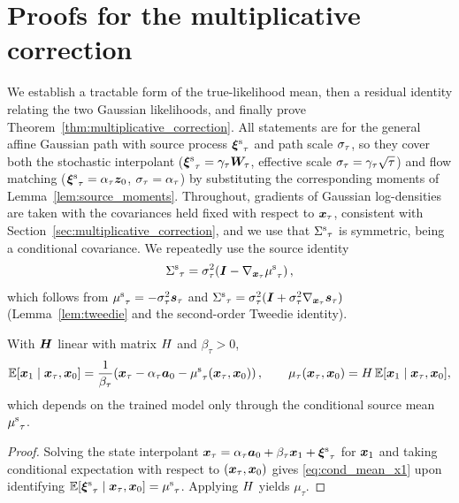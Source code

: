 \section{Proofs for the multiplicative correction}
\label{appendix:proof_multiplicative}

We establish a tractable form of the true-likelihood mean, then a residual identity relating the two Gaussian likelihoods, and finally prove Theorem~\ref{thm:multiplicative_correction}. All statements are for the general affine Gaussian path with source process ${\bm{\xi}^{\mathrm{s}}}_\tau$ and path scale $\sigma_\tau$, so they cover both the stochastic interpolant (${\bm{\xi}^{\mathrm{s}}}_\tau=\gamma_\tau\boldsymbol{W}_\tau$, effective scale $\sigma_\tau=\gamma_\tau\sqrt{\tau}$) and flow matching (${\bm{\xi}^{\mathrm{s}}}_\tau=\alpha_\tau\bm{z}_0$, $\sigma_\tau=\alpha_\tau$) by substituting the corresponding moments of Lemma~\ref{lem:source_moments}. Throughout, gradients of Gaussian log-densities are taken with the covariances held fixed with respect to $\boldsymbol{x}_\tau$, consistent with Section~\ref{sec:multiplicative_correction}, and we use that ${\Sigma^{\mathrm{s}}}_\tau$ is symmetric, being a conditional covariance. We repeatedly use the source identity
\begin{align}\label{eq:source_identity}
    {\Sigma^{\mathrm{s}}}_\tau = \sigma_\tau^2\!\left(\bm{I} - \nabla_{\boldsymbol{x}_\tau}{\mu^{\mathrm{s}}}_\tau\right),
\end{align}
which follows from ${\mu^{\mathrm{s}}}_\tau = -\sigma_\tau^2\bm{s}_\tau$ and ${\Sigma^{\mathrm{s}}}_\tau = \sigma_\tau^2(\bm{I} + \sigma_\tau^2\nabla_{\boldsymbol{x}_\tau}\bm{s}_\tau)$ (Lemma~\ref{lem:tweedie} and the second-order Tweedie identity).

\begin{lemma}\label{lem:true_mean}
With $\boldsymbol{H}$ linear with matrix $H$ and $\beta_\tau>0$,
\begin{align}\label{eq:cond_mean_x1}
    \mathbb{E}[\boldsymbol{x}_1 \mid \boldsymbol{x}_\tau, \boldsymbol{x}_0]
    = \frac{1}{\beta_\tau}\!\left(\boldsymbol{x}_\tau - \alpha_\tau \bm a_0 - {\mu^{\mathrm{s}}}_\tau(\boldsymbol{x}_\tau,\boldsymbol{x}_0)\right),
    \qquad
    \mu_\tau(\boldsymbol{x}_\tau,\boldsymbol{x}_0) = H\,\mathbb{E}[\boldsymbol{x}_1\mid\boldsymbol{x}_\tau,\boldsymbol{x}_0],
\end{align}
which depends on the trained model only through the conditional source mean ${\mu^{\mathrm{s}}}_\tau$.
\end{lemma}
\begin{proof}
Solving the state interpolant $\boldsymbol{x}_\tau=\alpha_\tau\bm a_0+\beta_\tau\boldsymbol{x}_1+{\bm{\xi}^{\mathrm{s}}}_\tau$ for $\boldsymbol{x}_1$ and taking conditional expectation with respect to $(\boldsymbol{x}_\tau,\boldsymbol{x}_0)$ gives \eqref{eq:cond_mean_x1} upon identifying $\mathbb{E}[{\bm{\xi}^{\mathrm{s}}}_\tau\mid\boldsymbol{x}_\tau,\boldsymbol{x}_0]={\mu^{\mathrm{s}}}_\tau$. Applying $H$ yields $\mu_\tau$.
\end{proof}

